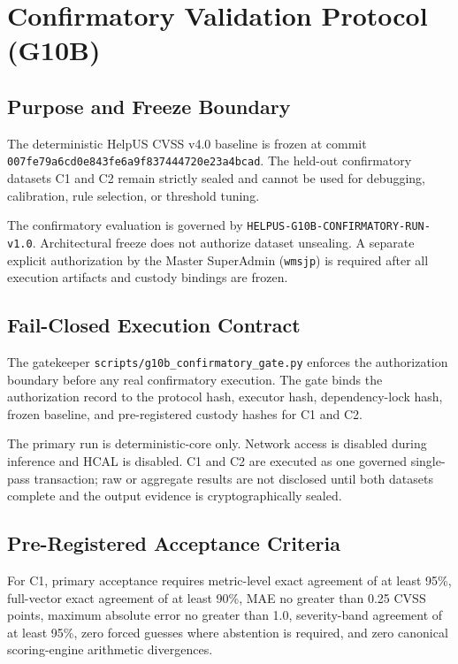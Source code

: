 \chapter{Confirmatory Validation Protocol (G10B)}
\label{chap:g10b_confirmatory}

\section{Purpose and Freeze Boundary}
The deterministic HelpUS CVSS v4.0 baseline is frozen at commit
\texttt{007fe79a6cd0e843fe6a9f837444720e23a4bcad}. The held-out
confirmatory datasets C1 and C2 remain strictly sealed and cannot be used for
debugging, calibration, rule selection, or threshold tuning.

The confirmatory evaluation is governed by
\texttt{HELPUS-G10B-CONFIRMATORY-RUN-v1.0}. Architectural freeze does not
authorize dataset unsealing. A separate explicit authorization by the Master
SuperAdmin (\texttt{wmsjp}) is required after all execution artifacts and
custody bindings are frozen.

\section{Fail-Closed Execution Contract}
The gatekeeper \texttt{scripts/g10b\_confirmatory\_gate.py} enforces the
authorization boundary before any real confirmatory execution. The gate binds
the authorization record to the protocol hash, executor hash, dependency-lock
hash, frozen baseline, and pre-registered custody hashes for C1 and C2.

The primary run is deterministic-core only. Network access is disabled during
inference and HCAL is disabled. C1 and C2 are executed as one governed
single-pass transaction; raw or aggregate results are not disclosed until both
datasets complete and the output evidence is cryptographically sealed.

\section{Pre-Registered Acceptance Criteria}
For C1, primary acceptance requires metric-level exact agreement of at least
95\%, full-vector exact agreement of at least 90\%, MAE no greater than 0.25
CVSS points, maximum absolute error no greater than 1.0, severity-band
agreement of at least 95\%, zero forced guesses where abstention is required,
and zero canonical scoring-engine arithmetic divergences.

